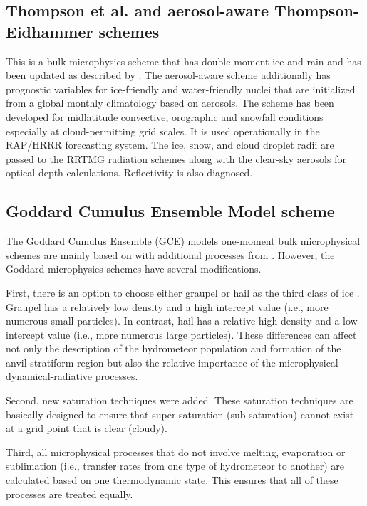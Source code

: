 \subsection{Thompson et al. and aerosol-aware Thompson-Eidhammer schemes}
This is a bulk microphysics scheme that has double-moment ice and rain and has been updated as described by \citet{thompson08}. The aerosol-aware scheme \citep{thompson14}
additionally has prognostic variables for ice-friendly and water-friendly nuclei that are initialized from a global monthly climatology based on aerosols. The scheme has been developed for midlatitude convective, orographic and snowfall conditions especially at cloud-permitting grid scales. It is used operationally in the RAP/HRRR forecasting system. The ice, snow,
and cloud droplet radii are passed to the RRTMG radiation schemes along with the clear-sky aerosols for optical depth calculations. Reflectivity is also diagnosed.

\subsection{Goddard Cumulus Ensemble Model scheme}

The Goddard Cumulus Ensemble (GCE) models \citep{tao93} one-moment bulk microphysical schemes  are mainly based on \citet{lin83} with additional processes from \citet{rutledge84}.  However, the Goddard microphysics schemes have several modifications. 

First, there is an option to choose either graupel or hail as the third class of ice \citep{mccumber91}.  Graupel has a relatively low density and a high intercept value (i.e., more numerous small particles).  In contrast, hail has a relative high density and a low intercept value (i.e., more numerous large particles).  These differences can affect not only the description of the hydrometeor population and formation of the anvil-stratiform region but also the relative importance of the microphysical-dynamical-radiative processes. 

Second, new saturation techniques \citep{tao89, tao03} were added.  These saturation techniques are basically designed to ensure that super saturation (sub-saturation) cannot exist at a grid point that is clear (cloudy).  

Third, all microphysical processes that do not involve melting, evaporation or sublimation (i.e., transfer rates from one type of hydrometeor to another) are calculated based on one thermodynamic state.  This ensures that all of these processes are treated equally. 


